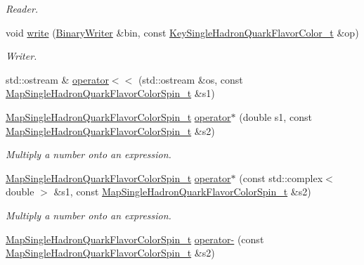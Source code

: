 \begin{DoxyCompactItemize}
\begin{DoxyCompactList}\small\item\em Reader. \end{DoxyCompactList}\item 
void \mbox{\hyperlink{namespaceHadron_a36eb0d304eb3644075b1598cde742d87}{write}} (\mbox{\hyperlink{classADATIO_1_1BinaryWriter}{Binary\+Writer}} \&bin, const \mbox{\hyperlink{structHadron_1_1KeySingleHadronQuarkFlavorColor__t}{Key\+Single\+Hadron\+Quark\+Flavor\+Color\+\_\+t}} \&op)
\begin{DoxyCompactList}\small\item\em Writer. \end{DoxyCompactList}\item 
std\+::ostream \& \mbox{\hyperlink{namespaceHadron_aa68c7efacb8bc21a4d87aede8544def5}{operator$<$$<$}} (std\+::ostream \&os, const \mbox{\hyperlink{namespaceHadron_a03b319764f85c20434f20a269ce5f388}{Map\+Single\+Hadron\+Quark\+Flavor\+Color\+Spin\+\_\+t}} \&s1)
\item 
\mbox{\hyperlink{namespaceHadron_a03b319764f85c20434f20a269ce5f388}{Map\+Single\+Hadron\+Quark\+Flavor\+Color\+Spin\+\_\+t}} \mbox{\hyperlink{namespaceHadron_af8f26e76a642072270a910f3326d758f}{operator$\ast$}} (double s1, const \mbox{\hyperlink{namespaceHadron_a03b319764f85c20434f20a269ce5f388}{Map\+Single\+Hadron\+Quark\+Flavor\+Color\+Spin\+\_\+t}} \&s2)
\begin{DoxyCompactList}\small\item\em Multiply a number onto an expression. \end{DoxyCompactList}\item 
\mbox{\hyperlink{namespaceHadron_a03b319764f85c20434f20a269ce5f388}{Map\+Single\+Hadron\+Quark\+Flavor\+Color\+Spin\+\_\+t}} \mbox{\hyperlink{namespaceHadron_afeecee88605be038ceda273e796e53fd}{operator$\ast$}} (const std\+::complex$<$ double $>$ \&s1, const \mbox{\hyperlink{namespaceHadron_a03b319764f85c20434f20a269ce5f388}{Map\+Single\+Hadron\+Quark\+Flavor\+Color\+Spin\+\_\+t}} \&s2)
\begin{DoxyCompactList}\small\item\em Multiply a number onto an expression. \end{DoxyCompactList}\item 
\mbox{\hyperlink{namespaceHadron_a03b319764f85c20434f20a269ce5f388}{Map\+Single\+Hadron\+Quark\+Flavor\+Color\+Spin\+\_\+t}} \mbox{\hyperlink{namespaceHadron_a2cee38a50a5e1ed5fbff1d9e4df08bdd}{operator-\/}} (const \mbox{\hyperlink{namespaceHadron_a03b319764f85c20434f20a269ce5f388}{Map\+Single\+Hadron\+Quark\+Flavor\+Color\+Spin\+\_\+t}} \&s2)

\end{DoxyCompactItemize}
